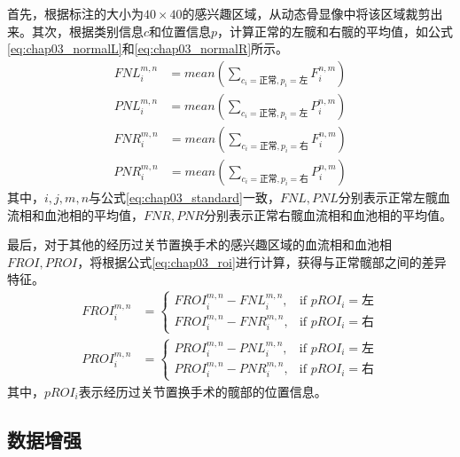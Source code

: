 首先，根据标注的大小为\(40 \times 40\)的感兴趣区域，从动态骨显像中将该区域裁剪出来。其次，根据类别信息\(c\)和位置信息\(p\)，计算正常的左髋和右髋的平均值，如公式\ref{eq:chap03_normalL}和\ref{eq:chap03_normalR}所示。
\begin{equation}
  \begin{aligned}
    FNL_{i}^{m, n} & = mean(\sum_{c_i = \text{正常}, p_i = \text{左} } F_i^{n, m}) \\
    PNL_{i}^{m, n} & = mean(\sum_{c_i = \text{正常}, p_i = \text{左} } P_i^{n, m})
  \end{aligned}
  \label{eq:chap03_normalL}
\end{equation}
\begin{equation}
  \begin{aligned}
    FNR_{i}^{m, n} & = mean(\sum_{c_i = \text{正常}, p_i = \text{右} } F_i^{n, m}) \\
    PNR_{i}^{m, n} & = mean(\sum_{c_i = \text{正常}, p_i = \text{右} } P_i^{n, m})
  \end{aligned}
  \label{eq:chap03_normalR}
\end{equation}
其中，\(i, j, m, n\)与公式\ref{eq:chap03_standard}一致，\(FNL, PNL\)分别表示正常左髋血流相和血池相的平均值，\(FNR, PNR\)分别表示正常右髋血流相和血池相的平均值。

最后，对于其他的经历过关节置换手术的感兴趣区域的血流相和血池相\(FROI, PROI\)，将根据公式\ref{eq:chap03_roi}进行计算，获得与正常髋部之间的差异特征。
\begin{equation}
  \begin{aligned}
    FROI_i^{m, n} & =
    \begin{cases}
      FROI_i^{m, n} - FNL_i^{m, n}, & \text{if \(pROI_i = \)左} \\
      FROI_i^{m, n} - FNR_i^{m, n}, & \text{if \(pROI_i = \)右}
    \end{cases} \\
    PROI_i^{m, n} & =
    \begin{cases}
      PROI_i^{m, n} - PNL_i^{m, n}, & \text{if \(pROI_i = \)左} \\
      PROI_i^{m, n} - PNR_i^{m, n}, & \text{if \(pROI_i = \)右}
    \end{cases}
  \end{aligned}
  \label{eq:chap03_roi}
\end{equation}
其中，\(pROI_i\)表示经历过关节置换手术的髋部的位置信息。

\subsection{数据增强}

